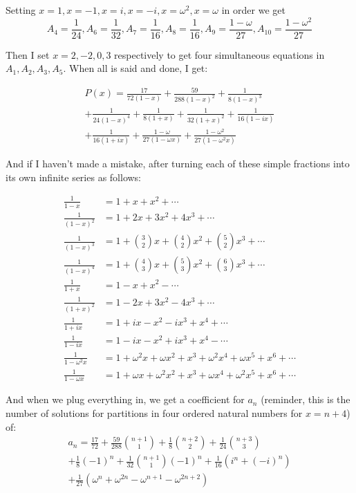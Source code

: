 \documentclass{article}
\begin{document}
Setting $x=1, x=-1, x=i, x=-i, x=\omega^2, x=\omega$ in order we get 
\[
A_4 = \frac{1}{24}, A_6 = \frac{1}{32}, A_7 = \frac{1}{16}, A_8 = \frac{1}{16}, A_9 = \frac{1-\omega}{27}, A_{10} = \frac{1-\omega^2}{27}
\]

Then I set $x=2, -2, 0, 3$ respectively to get four simultaneous equations in $A_1, A_2, A_3, A_5$. When all is said and done, I get:

\begin{multline*}P(x) = \frac{17}{72(1-x)} + \frac{59}{288(1-x)^2} + \frac{1}{8(1-x)^3} \\ + \frac{1}{24(1-x)^4} + \frac{1}{8(1+x)} + \frac{1}{32(1+x)^2} + \frac{1}{16(1-ix)} \\ + \frac{1}{16(1+ix)} + \frac{1-\omega}{27(1-\omega x)} + \frac{1-\omega^2}{27(1-\omega^2 x)}\end{multline*}

And if I haven’t made a mistake, after turning each of these simple fractions into its own infinite series as follows:

\begin{align*}
\frac{1}{1-x} &= 1 + x + x^2 + \cdots \\
\frac{1}{(1-x)^2} &= 1 + 2x + 3x^2 + 4x^3 + \cdots \\
\frac{1}{(1-x)^3} &= 1 + \binom{3}{2}x + \binom{4}{2}x^2 + \binom{5}{2}x^3 + \cdots \\
\frac{1}{(1-x)^4} &= 1 + \binom{4}{3}x + \binom{5}{3}x^2 + \binom{6}{3}x^3 + \cdots \\
\frac{1}{1+x} &= 1 - x + x^2 - \cdots \\
\frac{1}{(1+x)^2} &= 1 - 2x + 3x^2 - 4x^3 + \cdots \\
\frac{1}{1+ix} &= 1 + ix - x^2 - ix^3 + x^4 + \cdots \\
\frac{1}{1-ix} &= 1 - ix - x^2 + ix^3 + x^4 - \cdots \\
\frac{1}{1-\omega^2 x} &= 1 + \omega^2 x + \omega x^2 + x^3 + \omega^2 x^4 + \omega x^5 + x^6 + \cdots \\
\frac{1}{1-\omega x} &= 1 + \omega x + \omega^2 x^2 + x^3 + \omega x^4 + \omega^2 x^5 + x^6 + \cdots
\end{align*}

And when we plug everything in, we get a coefficient for $a_n$ (reminder, this is the number of
solutions for partitions in four ordered natural numbers for $x=n+4$) of:
\begin{multline*}
a_n = \frac{17}{72} + \frac{59}{288}\binom{n+1}{1} + \frac{1}{8}\binom{n+2}{2} + \frac{1}{24}\binom{n+3}{3} \\
+ \frac{1}{8}(-1)^n + \frac{1}{32}\binom{n+1}{1}(-1)^n + \frac{1}{16}(i^n + (-i)^n) \\
+ \frac{1}{27}\left(\omega^{n} + \omega^{2n} - \omega^{n+1} - \omega^{2n+2}\right)
\end{multline*}
\end{document}
